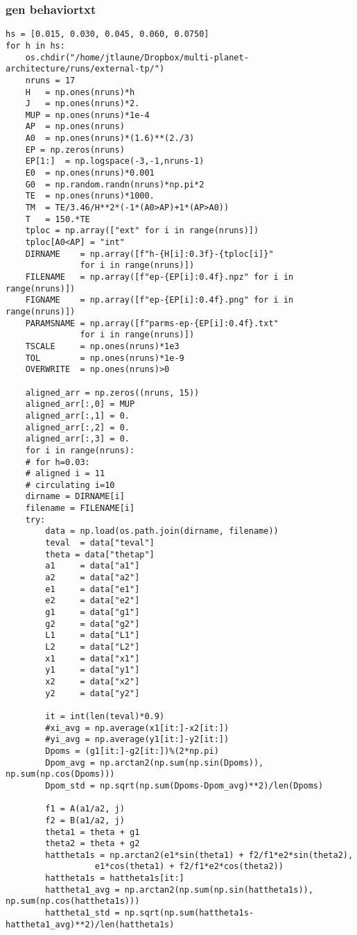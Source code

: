\documentclass[11pt]{article}
\begin{document}
\subsubsection{gen behaviortxt}
\label{sec:orge5b746a}
\begin{verbatim}
hs = [0.015, 0.030, 0.045, 0.060, 0.0750]
for h in hs:
    os.chdir("/home/jtlaune/Dropbox/multi-planet-architecture/runs/external-tp/")
    nruns = 17
    H   = np.ones(nruns)*h
    J   = np.ones(nruns)*2.
    MUP = np.ones(nruns)*1e-4
    AP  = np.ones(nruns)
    A0  = np.ones(nruns)*(1.6)**(2./3)
    EP = np.zeros(nruns)
    EP[1:]  = np.logspace(-3,-1,nruns-1)
    E0  = np.ones(nruns)*0.001
    G0  = np.random.randn(nruns)*np.pi*2
    TE  = np.ones(nruns)*1000.
    TM  = TE/3.46/H**2*(-1*(A0>AP)+1*(AP>A0))
    T   = 150.*TE
    tploc = np.array(["ext" for i in range(nruns)])
    tploc[A0<AP] = "int"
    DIRNAME    = np.array([f"h-{H[i]:0.3f}-{tploc[i]}"
			   for i in range(nruns)])
    FILENAME   = np.array([f"ep-{EP[i]:0.4f}.npz" for i in range(nruns)])
    FIGNAME    = np.array([f"ep-{EP[i]:0.4f}.png" for i in range(nruns)])
    PARAMSNAME = np.array([f"parms-ep-{EP[i]:0.4f}.txt"
			   for i in range(nruns)])
    TSCALE     = np.ones(nruns)*1e3
    TOL        = np.ones(nruns)*1e-9
    OVERWRITE  = np.ones(nruns)>0

    aligned_arr = np.zeros((nruns, 15))
    aligned_arr[:,0] = MUP
    aligned_arr[:,1] = 0.
    aligned_arr[:,2] = 0.
    aligned_arr[:,3] = 0.
    for i in range(nruns):
	# for h=0.03:
	# aligned i = 11
	# circulating i=10
	dirname = DIRNAME[i]
	filename = FILENAME[i]
	try:
	    data = np.load(os.path.join(dirname, filename))
	    teval  = data["teval"]
	    theta = data["thetap"]
	    a1     = data["a1"]
	    a2     = data["a2"]
	    e1     = data["e1"]
	    e2     = data["e2"]
	    g1     = data["g1"]
	    g2     = data["g2"]
	    L1     = data["L1"]
	    L2     = data["L2"]
	    x1     = data["x1"]
	    y1     = data["y1"]
	    x2     = data["x2"]
	    y2     = data["y2"]

	    it = int(len(teval)*0.9)
	    #xi_avg = np.average(x1[it:]-x2[it:])
	    #yi_avg = np.average(y1[it:]-y2[it:])
	    Dpoms = (g1[it:]-g2[it:])%(2*np.pi)
	    Dpom_avg = np.arctan2(np.sum(np.sin(Dpoms)), np.sum(np.cos(Dpoms)))
	    Dpom_std = np.sqrt(np.sum(Dpoms-Dpom_avg)**2)/len(Dpoms)

	    f1 = A(a1/a2, j)
	    f2 = B(a1/a2, j)
	    theta1 = theta + g1
	    theta2 = theta + g2
	    hattheta1s = np.arctan2(e1*sin(theta1) + f2/f1*e2*sin(theta2),
				  e1*cos(theta1) + f2/f1*e2*cos(theta2))
	    hattheta1s = hattheta1s[it:]
	    hattheta1_avg = np.arctan2(np.sum(np.sin(hattheta1s)), np.sum(np.cos(hattheta1s)))
	    hattheta1_std = np.sqrt(np.sum(hattheta1s-hattheta1_avg)**2)/len(hattheta1s)


\end{verbatim}
\end{document}
